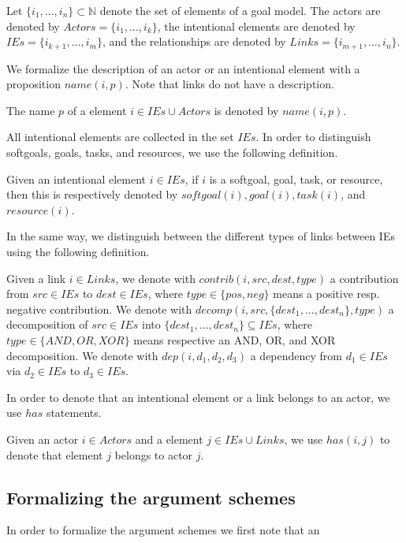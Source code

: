 \begin{definition}[Elements]
Let $\{i_1,\ldots,i_n\}\subset \mathbb{N}$ denote the set of elements of a goal model.
The actors are denoted by $Actors=\{i_1,\ldots,i_k\}$, the intentional elements are denoted by $IEs=\{i_{k+1},\ldots,i_m\}$, and the relationships are denoted by $Links=\{i_{m+1},\ldots,i_n\}$.
\end{definition}

We formalize the description of an actor or an intentional element with a proposition $name(i,p)$. Note that links do not have a description.

\begin{definition}
The name $p$ of a element $i\in IEs\cup Actors$ is denoted by $name(i,p)$.
\end{definition}

All intentional elements are collected in the set $IEs$. In order to distinguish softgoals, goals, tasks, and resources, we use the following definition.

\begin{definition}
Given an intentional element $i\in IEs$, if $i$ is a softgoal, goal, task, or resource, then this is respectively denoted by $softgoal(i), goal(i), task(i)$, and $resource(i)$.
\end{definition}

In the same way, we distinguish between the different types of links between IEs using the following definition.

\begin{definition}[Links]
Given a link $i\in Links$, we denote with $contrib(i,src,dest,type)$ a contribution from $src\in IEs$ to $dest\in IEs$, where $type\in\{pos,neg\}$ means a positive resp. negative contribution. We denote with $decomp(i,src,\{dest_1,\ldots,dest_n\},type)$ a decomposition of $src\in IEs$ into $\{dest_1,\dots,dest_n\}\subseteq IEs$, where $type\in\{AND,OR,XOR\}$ means respective an AND, OR, and XOR decomposition. We denote with $dep(i,d_1,d_2,d_3)$ a dependency from $d_1\in IEs$ via $d_2\in IEs$ to $d_3\in IEs$.
\end{definition}

In order to denote that an intentional element or a link belongs to an actor, we use $has$ statements.

\begin{definition}
Given an actor $i\in Actors$ and a element $j\in IEs\cup Links$, we use $has(i,j)$ to denote that element $j$ belongs to actor $j$.
\end{definition}


\subsection{Formalizing the argument schemes}

In order to formalize the argument schemes we first note that an 